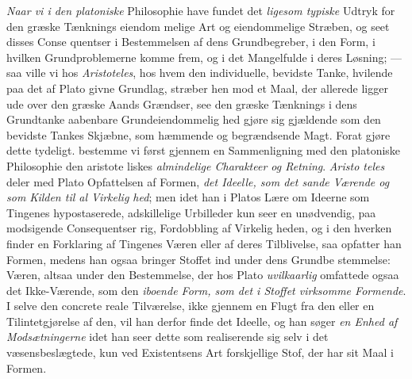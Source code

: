 \emph{Naar vi i den platoniske} Philosophie have fundet det
\emph{ligesom typiske} Udtryk for den græske Tænknings eiendom\-%
melige Art og eiendommelige Stræben, og seet disses Conse\-%
quentser i Bestemmelsen af dens Grundbegreber, i den Form,
i hvilken Grundproblemerne komme frem, og i det Mangelfulde
i deres Løsning; --- saa ville vi hos \emph{Aristoteles}, hos
hvem den individuelle, bevidste Tanke, hvilende paa det af
Plato givne Grundlag, stræber hen mod et Maal, der allerede
ligger ude over den græske Aands Grændser, see den græske
Tænknings i dens Grundtanke aabenbare Grundeiendommelig\-%
hed gjøre sig gjældende som den bevidste Tankes Skjæbne,
som hæmmende og begrændsende Magt.
Forat gjøre dette tydeligt. bestemme vi først gjennem en
Sammenligning med den platoniske Philosophie den aristote\-%
liskes \emph{almindelige Charakteer og Retning}. \emph{Aristo\-%
teles} deler med Plato Opfattelsen af Formen, \emph{det Ideelle,
som det sande Værende og som Kilden til al Virkelig\-%
hed}; men idet han i Platos Lære om Ideerne som Tingenes
hypostaserede, adskillelige Urbilleder kun seer en unødvendig,
paa modsigende Consequentser rig, Fordobbling af Virkelig\-%
heden, og i den hverken finder en Forklaring af Tingenes
Væren eller af deres Tilblivelse, saa opfatter han Formen,
medens han ogsaa bringer Stoffet ind under dens Grundbe\-%
stemmelse: Væren, altsaa under den Bestemmelse, der hos Plato
\emph{uvilkaarlig} omfattede ogsaa det Ikke-Værende, som den
\emph{iboende Form, som det i Stoffet virksomme Formende}.
I selve den concrete reale Tilværelse, ikke gjennem en Flugt fra
den eller en Tilintetgjørelse af den, vil han derfor finde det Ideelle,
og han søger \emph{en Enhed af Modsætningerne} idet han seer
dette som realiserende sig selv i det væsensbeslægtede, kun ved
Existentsens Art forskjellige Stof, der har sit Maal i Formen.

